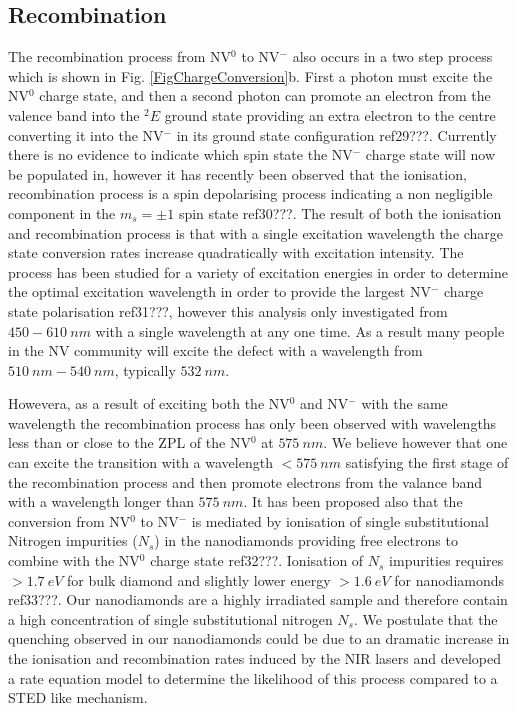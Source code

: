 \documentclass[prl]{revtex4}
\begin{document}
\subsection{Recombination}
The recombination process from NV$^0$ to NV$^-$ also occurs in a two step process which is shown in Fig. \ref{FigChargeConversion}b. First a photon must excite the NV$^0$ charge state, and then a second photon can promote an electron from the valence band into the $^2E$ ground state providing an extra electron to the centre converting it into the NV$^-$ in its ground state configuration ref29???. Currently there is no evidence to indicate which spin state the NV$^-$ charge state will now be populated in, however it has recently been observed that the ionisation, recombination process is a spin depolarising process indicating a non negligible component in the $m_s=\pm1$ spin state ref30???. The result of both the ionisation and recombination process is that with a single excitation wavelength the charge state conversion rates increase quadratically with excitation intensity. The process has been studied for a variety of excitation energies in order to determine the optimal excitation wavelength in order to provide the largest NV$^-$ charge state polarisation ref31???, however this analysis only investigated from $\SI{450}-\SI{610}{nm}$ with a single wavelength at any one time. As a result many people in the NV community will excite the defect with a wavelength from $\SI{510}{nm}-\SI{540}{nm}$, typically $\SI{532}{nm}$.

Howevera, as a result of exciting both the NV$^0$ and NV$^-$ with the same wavelength the recombination process has only been observed with wavelengths less than or close to the ZPL of the NV$^0$ at $\SI{575}{nm}$. We believe however that one can excite the transition with a wavelength $<\SI{575}{nm}$ satisfying the first stage of the recombination process and then promote electrons from the valance band with a wavelength longer than $\SI{575}{nm}$. It has been proposed also that the conversion from NV$^0$ to NV$^-$ is mediated by ionisation of single substitutional Nitrogen impurities ($N_s$) in the nanodiamonds providing free electrons to combine with the NV$^0$ charge state ref32???. Ionisation of $N_s$ impurities requires $>\SI{1.7}{eV}$ for bulk diamond and slightly lower energy $>\SI{1.6}{eV}$ for nanodiamonds ref33???. Our nanodiamonds are a highly irradiated sample and therefore contain a high concentration of single substitutional nitrogen $N_s$. We postulate that the quenching observed in our nanodiamonds could be due to an dramatic increase in the ionisation and recombination rates induced by the NIR lasers and developed a rate equation model to determine the likelihood of this process compared to a STED like mechanism.
\end{document}
